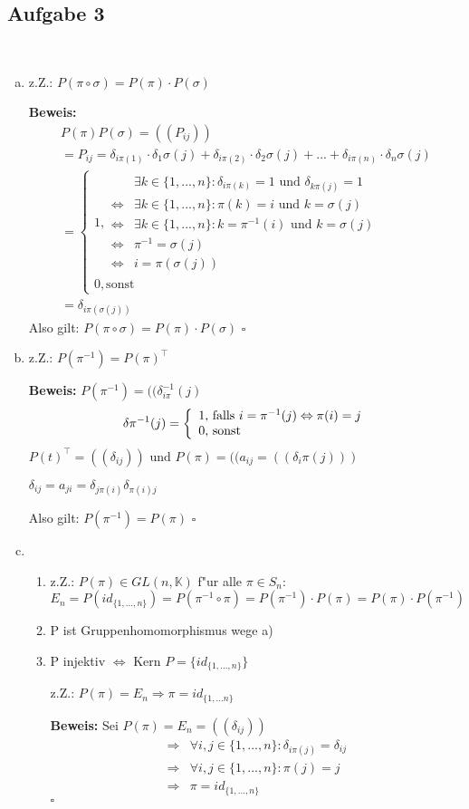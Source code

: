 \documentclass[a4paper,twoside,DIV15,BCOR12mm]{scrbook}
\newcommand{\enue}{\ \begin{enumerate}[(1)]}
\newcommand{\enua}{\ \begin{enumerate}[a)]}
\newcommand{\une}{\end{enumerate}}
\renewcommand{\K}{\ensuremath{\mathbb{K}}}
\newcommand{\RA}{\Rightarrow}
\newcommand{\LRA}{\Leftrightarrow}
\newcommand{\x}{\cdot}
\newcommand{\trans}{^\top}
\newenvironment{bew}{\pagebreak[2]\textbf{Beweis: }}{\qed}
\renewcommand{\qed}{\hspace*{\fill} \ensuremath{\square}}
\begin{document}
\subsection{Aufgabe 3}
\enua
\item z.Z.: $P(\pi\circ\sigma)=P(\pi)\x P(\sigma)$\par
\begin{bew}\begin{eqnarray*}
P(\pi)P(\sigma)=((P_{ij}))\\
= P_{ij}=\delta_{i\pi(1)}\x\delta_1\sigma(j)+\delta_{i\pi(2)}\x\delta_2\sigma(j)+...+\delta_{i\pi(n)}\x\delta_n\sigma(j)\\
= \left\{\begin{array}{ll}1, \begin{array}{cl}
&\exists k\in\{1,...,n\}: \delta_{i\pi(k)}=1\text{ und }\delta_{k\pi(j)}=1\\
\LRA&\exists k\in\{1,...,n\}:\pi(k)=i\text{ und }k=\sigma(j)\\
\LRA&\exists k\in\{1,...,n\}: k=\pi^{-1}(i)\text{ und }k=\sigma(j)\\
\LRA&\pi^{-1}=\sigma(j)\\
\LRA& i=\pi(\sigma(j))
\end{array}\\
0, \text{sonst}\end{array}\right.\\
= \delta_{i\pi(\sigma(j))}\end{eqnarray*}
Also gilt: $P(\pi\circ\sigma)=P(\pi)\x P(\sigma)$
\end{bew}
\item z.Z.: $P(\pi^{-1})=P(\pi)\trans$\par
\begin{bew} $P(\pi^{-1})=((\delta_{i\pi}^{-1}(j)$
\[\delta\pi^{-1}(j)=\left\{\begin{array}l \text{1, falls }i=\pi^{-1}(j)\LRA\pi(i)=j\\
\text{0, sonst}\end{array}\right.\]
$P(t)\trans=((\delta_{ij}))\text{ und }P(\pi)=((a_{ij}=((\delta_i\pi(j)))$\par
$\delta_{ij}=a_{ji}=\delta_{j\pi(i)}\delta_{\pi(i)j}$\par
Also gilt: $P(\pi^{-1})=P(\pi)$
\end{bew}
\item\enue\item z.Z.: $P(\pi)\in GL(n,\K)$ f"ur alle $\pi\in S_n$:
\[E_n=P(id_{\{1,...,n\}})=P(\pi^{-1}\circ\pi)=P(\pi^{-1})\x P(\pi)=P(\pi)\x P(\pi^{-1})\]
\item P ist Gruppenhomomorphismus wege a)
\item P injektiv $\LRA$ Kern $P=\{id_{\{1,...,n\}}\}$\par
z.Z.: $P(\pi)=E_n\RA\pi=id_{\{1,...n\}}$\par
\begin{bew} Sei $P(\pi)=E_n=((\delta_{ij}))$
\begin{eqnarray*}
\RA & \forall i,j\in\{1,...,n\}: \delta_{i\pi(j)}=\delta_{ij}\\
\RA & \forall i,j\in\{1,...,n\}: \pi(j)=j\\
\RA & \pi = id_{\{1,...,n\}}
\end{eqnarray*}
\end{bew}
\une
\une
\end{document}
